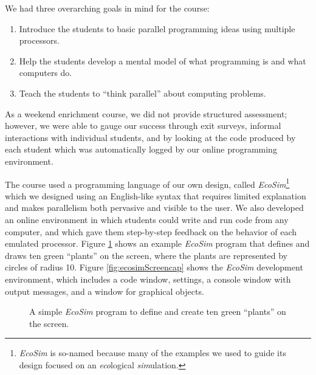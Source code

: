 \documentclass{sig-alternate}
\newcommand{\INDSTATE}[1][1]{\STATE\hspace{#1\algorithmicindent}}
\newcommand{\EcoSim}{\emph{EcoSim}}
\begin{document}
We had three overarching goals in mind for the course:
\begin{enumerate}
\item Introduce the students to basic parallel programming ideas using multiple processors.
\item Help the students develop a mental model of what programming is and what computers do.
\item Teach the students to ``think parallel'' about computing problems.
\end{enumerate}
As a weekend enrichment course, we did not provide structured assessment;
however, we were able to gauge our success through exit surveys, 
informal interactions with individual students, and by looking at the code produced by each student
which was automatically logged by our online programming environment.

The course used a programming language of our own design, called \EcoSim{}\footnote{
\EcoSim{} is so-named because many of the examples we used to guide its design 
focused on an \emph{eco}logical \emph{sim}ulation.} 
which we designed using an English-like syntax that requires limited explanation 
and makes parallelism both pervasive and visible to the user.
We also developed an online environment in which students could write and run code from any computer,
and which gave them step-by-step feedback on the behavior of each emulated processor.
Figure \ref{fig:exampleProgram} shows an example \emph{EcoSim} program that defines and
draws ten green ``plants'' on the screen, where the plants are represented by circles of radius 10.
Figure \ref{fig:ecosimScreencap} shows the \emph{EcoSim} development environment, which includes
a code window, settings, a console window with output messages, and a window for graphical objects.
\begin{figure}
\begin{algorithmic}[1]
  \INDSTATE{a position}
  \INDSTATE{size, a number}
  \INDSTATE{a color}
\STATE{}
  \INDSTATE{do in order}
  \INDSTATE[2]{replace the plant's color with green}
  \INDSTATE[2]{replace the plant's size with 10}
\end{algorithmic} 
\caption{A simple \emph{EcoSim} program to define and create ten green ``plants'' on the screen.}
\label{fig:exampleProgram} 
\end{figure}
\end{document}
